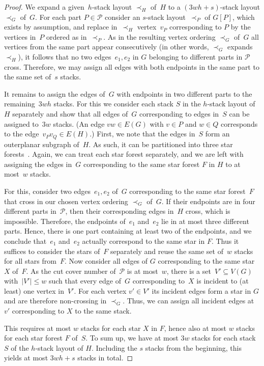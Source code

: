 \documentclass{theoretics}
\newcommand{\calP}{\ensuremath{\mathcal{P}}\xspace}
\begin{document}
\begin{proof}
    We expand a given~$h$-stack layout $\prec_H$ of~$H$ to a $(3wh + s)$-stack layout $\prec_G$ of~$G$.
    For each part $P \in \calP$ consider an $s$-stack layout~$\prec_P$ of $ G[P] $, which exists by assumption,
    and replace in~$\prec_H$ vertex~$v_P$ corresponding to $P$ by the vertices in~$P$ ordered as in~$\prec_P$.
    As in the resulting vertex ordering $\prec_G$ of~$G$ all vertices from the same part appear consecutively (in other words, $\prec_G$ expands $\prec_H$), it follows that no two edges~$e_1, e_2$ in $G$ belonging to different parts in $\calP$ cross.
    Therefore, we may assign all edges with both endpoints in the same part to the same set of~$s$ stacks.

    It remains to assign the edges of~$G$ with endpoints in two different parts to the remaining~$3wh$ stacks.
    For this we consider each stack $S$ in the $h$-stack layout of~$H$ separately and show that all edges of~$G$ 
    corresponding to edges in~$S$
    can be assigned to~$3w$ stacks.
    (An edge $vw \in E(G)$ with $v \in P$ and $w \in Q$ corresponds to the edge~$v_Pv_Q \in E(H)$.)
    First, we note that the edges in~$S$ form an outerplanar subgraph of~$H$.
    As such, it can be partitioned into three star forests~\cite{Hakimi1996_StarAboricity}.
    Again, we can treat each star forest separately, and we are left with assigning the edges in~$G$ corresponding to the same star forest $F$ in $H$ to at most~$w$ stacks.

    For this, consider two edges~$e_1, e_2$ of~$G$ corresponding to the same star forest~$F$ that cross in our chosen vertex ordering $\prec_G$ of~$G$.
    If their endpoints are in four different parts in~$\calP$, then their corresponding edges in~$H$ cross, which is impossible.
    Therefore, the endpoints of~$e_1$ and~$e_2$ lie in at most three different parts.
    Hence, there is one part containing at least two of the endpoints, and we conclude that~$e_1$ and~$e_2$ actually correspond to the same star in $F$.
    Thus it suffices to consider the stars of~$F$ separately and reuse the same set of~$w$ stacks for all stars from~$F$.
    Now consider all edges of $G$ corresponding to the same star~$X$ of~$F$.
    As the cut cover number of~$\calP$ is at most~$w$, there is a set~$V' \subseteq V(G)$ with~$|V'| \leq w$ such that every edge of~$G$ corresponding to~$X$ is incident to (at least) one vertex in~$V'$.
    For each vertex $v' \in V'$ its incident edges form a star in $G$ and are therefore non-crossing in $\prec_G$.
    Thus, we can assign all incident edges at $v'$ corresponding to $X$ to the same stack.
    
    This requires at most $w$ stacks for each star $X$ in $F$, hence also at most $w$ stacks for each star forest $F$ of~$S$. To sum up, we have at most $3w$ stacks for each stack $S$ of the $h$-stack layout of $H$.
    Including the $s$ stacks from the beginning, this yields at most $3wh + s$ stacks in total.
\end{proof}
\end{document}
